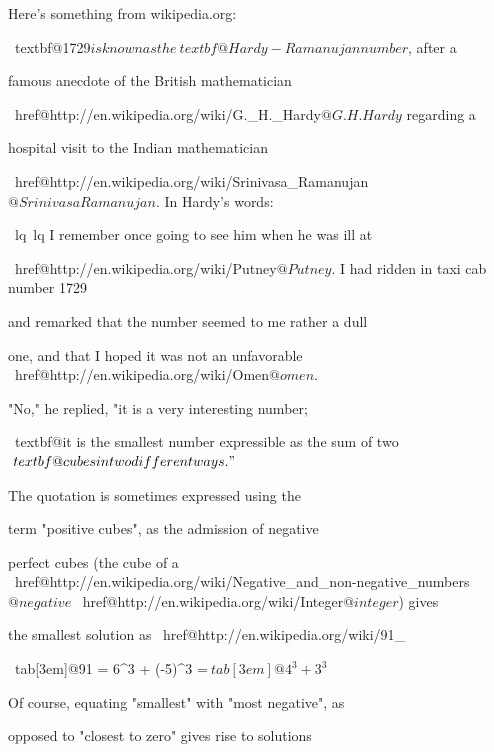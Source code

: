 Here's something from wikipedia.org:

\begin{console}[commandchars=\~\@\$]

~textbf@1729$ is known as the ~textbf@Hardy-Ramanujan number$, after a

famous anecdote of the British mathematician

~href@http://en.wikipedia.org/wiki/G._H._Hardy$@G. H. Hardy$ regarding a

hospital visit to the Indian mathematician

~href@http://en.wikipedia.org/wiki/Srinivasa_Ramanujan$@Srinivasa

Ramanujan$. In Hardy's words:



~lq~lq I remember once going to see him when he was ill at

~href@http://en.wikipedia.org/wiki/Putney$@Putney$. I had ridden in taxi cab number 1729

and remarked that the number seemed to me rather a dull

one, and that I hoped it was not an unfavorable ~href@http://en.wikipedia.org/wiki/Omen$@omen$.

"No," he replied, "it is a very interesting number;

~textbf@it is the smallest number expressible as the sum of two$

~textbf@cubes in two different ways."$



The quotation is sometimes expressed using the

term "positive cubes", as the admission of negative

perfect cubes (the cube of a ~href@http://en.wikipedia.org/wiki/Negative_and_non-negative_numbers$@negative$ ~href@http://en.wikipedia.org/wiki/Integer$@integer$) gives

the smallest solution as ~href@http://en.wikipedia.org/wiki/91_%



~tab[3em]@91 = 6^3 + (-5)^3 =$

~tab[3em]@4^3 + 3^3$



Of course, equating "smallest" with "most negative", as

opposed to "closest to zero" gives rise to solutions


\end{console}
